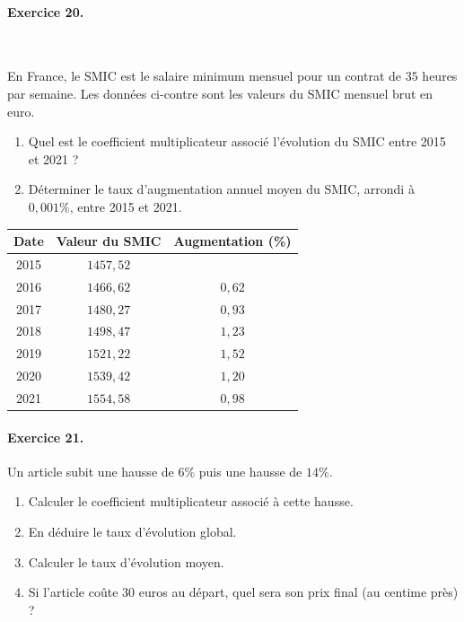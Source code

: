 \documentclass[11pt]{article}
\begin{document}
\paragraph{Exercice 20.}~\\[2mm]
\begin{minipage}{.5\textwidth}
  En France, le SMIC est le salaire minimum mensuel pour un contrat de $35$
  heures par semaine. Les données ci-contre sont les valeurs du SMIC mensuel
  brut en euro.
  \begin{enumerate}
    \item Quel est le coefficient multiplicateur associé  l'évolution du SMIC
      entre 2015 et 2021 ?
    \item Déterminer le taux d'augmentation annuel moyen du SMIC, arrondi à
      $0,001\%$, entre 2015 et 2021.
  \end{enumerate}
\end{minipage}
\begin{minipage}{.5\textwidth}
\begin{center}
\begin{tabular}{ccc}
  \toprule
  \textbf{Date} & \textbf{Valeur du SMIC} & \textbf{Augmentation (\%)} \\
  \midrule
  2015 & $1457,52$ & \\
  2016 & $1466,62$ & $0,62$ \\
  2017 & $1480,27$ & $0,93$ \\
  2018 & $1498,47$ & $1,23$ \\
  2019 & $1521,22$ & $1,52$ \\
  2020 & $1539,42$ & $1,20$ \\
  2021 & $1554,58$ & $0,98$ \\
  \bottomrule
\end{tabular}
\end{center}
\end{minipage}

\paragraph{Exercice 21.} Un article subit une hausse de $6\%$ puis une hausse de
$14\%$.
\begin{enumerate}
  \item Calculer le coefficient multiplicateur associé à cette hausse.
  \item En déduire le taux d'évolution global.
  \item Calculer le taux d'évolution moyen.
  \item Si l'article coûte $30$ euros au départ, quel sera son prix final (au
    centime près) ?
\end{enumerate}
\end{document}
